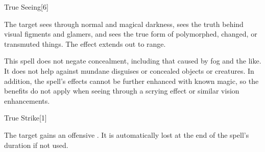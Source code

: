 \begin{spellsection}{True Seeing}[6]
    \begin{spellheader}
    \end{spellheader}
    \begin{spellcontent}
        \begin{spelltargetinginfo}
        \end{spelltargetinginfo}
        \begin{spelleffects}
            \spelleffect The target sees through normal and magical darkness, sees the truth behind visual figments and glamers, and sees the true form of polymorphed, changed, or transmuted things. The effect extends out to \rngmed range.
            \spelldur \durshort
        \end{spelleffects}
    \end{spellcontent}
    \begin{spellfooter}
        \spellnotes This spell does not negate concealment, including that caused by fog and the like. It does not help against mundane disguises or concealed objects or creatures. In addition, the spell's effects cannot be further enhanced with known magic, so the benefits do not apply when seeing through a scrying effect or similar vision enhancements.
        \miscastexplode
    \end{spellfooter}
\end{spellsection}

\begin{spellsection}{True Strike}[1]
    \begin{spellheader}
    \end{spellheader}
    \begin{spellcontent}
        \begin{spelltargetinginfo}
        \end{spelltargetinginfo}
        \begin{spelleffects}
            \spelleffect The target gains an offensive . It is automatically lost at the end of the spell's duration if not used.
            \spelldur \durshort
        \end{spelleffects}
    \end{spellcontent}
    \begin{spellfooter}
        \miscastrandom
    \end{spellfooter}
    \begin{spellaugments}
    \end{spellaugments}
\end{spellsection}

